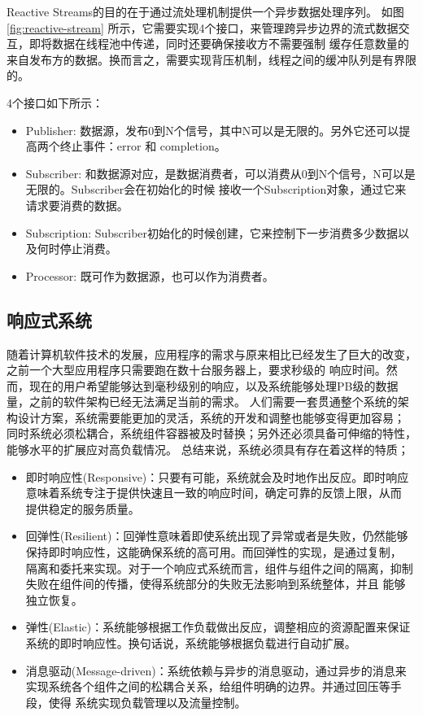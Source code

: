 \documentclass[master]{njuthesis}
\begin{document}
Reactive Streams的目的在于通过流处理机制提供一个异步数据处理序列\cite{7203125}。
如图\ref{fig:reactive-stream} 所示，它需要实现4个接口，来管理跨异步边界的流式数据交互，即将数据在线程池中传递，同时还要确保接收方不需要强制
缓存任意数量的来自发布方的数据。换而言之，需要实现背压机制，线程之间的缓冲队列是有界限的。

4个接口如下所示：
\begin{itemize}
  \item Publisher: 数据源，发布0到N个信号，其中N可以是无限的。另外它还可以提高两个终止事件：error 和 completion。
  \item Subscriber: 和数据源对应，是数据消费者，可以消费从0到N个信号，N可以是无限的。Subscriber会在初始化的时候
  接收一个Subscription对象，通过它来请求要消费的数据。
  \item Subscription: Subscriber初始化的时候创建，它来控制下一步消费多少数据以及何时停止消费。
  \item Processor: 既可作为数据源，也可以作为消费者。
\end{itemize}


\subsection{响应式系统}

随着计算机软件技术的发展，应用程序的需求与原来相比已经发生了巨大的改变，之前一个大型应用程序只需要跑在数十台服务器上，要求秒级的
响应时间\cite{6691765}。然而，现在的用户希望能够达到毫秒级别的响应，以及系统能够处理PB级的数据量，之前的软件架构已经无法满足当前的需求。
人们需要一套贯通整个系统的架构设计方案，系统需要能更加的灵活，系统的开发和调整也能够变得更加容易；
同时系统必须松耦合，系统组件容器被及时替换；另外还必须具备可伸缩的特性，能够水平的扩展应对高负载情况。
总结来说，系统必须具有存在着这样的特质\cite{fionda2015nautilod}；

\begin{itemize}
  \item 即时响应性(Responsive)：只要有可能，系统就会及时地作出反应。即时响应意味着系统专注于提供快速且一致的响应时间，确定可靠的反馈上限，从而
  提供稳定的服务质量。
  \item 回弹性(Resilient)：回弹性意味着即使系统出现了异常或者是失败，仍然能够保持即时响应性，这能确保系统的高可用。而回弹性的实现，是通过复制，
  隔离和委托来实现。对于一个响应式系统而言，组件与组件之间的隔离，抑制失败在组件间的传播，使得系统部分的失败无法影响到系统整体，并且
  能够独立恢复。
  \item 弹性(Elastic)：系统能够根据工作负载做出反应，调整相应的资源配置来保证系统的即时响应性。换句话说，系统能够根据负载进行自动扩展。
  \item 消息驱动(Message-driven)：系统依赖与异步的消息驱动，通过异步的消息来实现系统各个组件之间的松耦合关系，给组件明确的边界。并通过回压等手段，使得
  系统实现负载管理以及流量控制。
\end{itemize}
\end{document}
